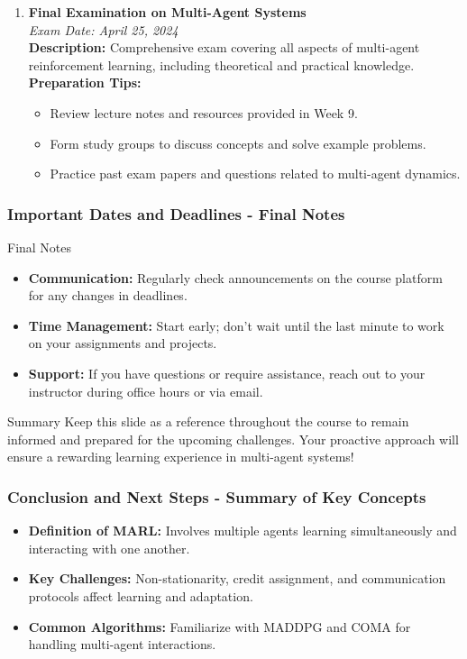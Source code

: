 \documentclass[aspectratio=169]{beamer}
\begin{document}
\begin{frame}[fragile]
\begin{enumerate}
        \item \textbf{Final Examination on Multi-Agent Systems}\\
        \textit{Exam Date: April 25, 2024}\\
        \textbf{Description:} Comprehensive exam covering all aspects of multi-agent reinforcement learning, including theoretical and practical knowledge.\\
        \textbf{Preparation Tips:}
        \begin{itemize}
            \item Review lecture notes and resources provided in Week 9.
            \item Form study groups to discuss concepts and solve example problems.
            \item Practice past exam papers and questions related to multi-agent dynamics.
        \end{itemize}
    \end{enumerate}
\end{frame}

\begin{frame}[fragile]
    \frametitle{Important Dates and Deadlines - Final Notes}
    \begin{block}{Final Notes}
        \begin{itemize}
            \item \textbf{Communication:} Regularly check announcements on the course platform for any changes in deadlines.
            \item \textbf{Time Management:} Start early; don’t wait until the last minute to work on your assignments and projects.
            \item \textbf{Support:} If you have questions or require assistance, reach out to your instructor during office hours or via email.
        \end{itemize}
    \end{block}
    
    \begin{block}{Summary}
        Keep this slide as a reference throughout the course to remain informed and prepared for the upcoming challenges. Your proactive approach will ensure a rewarding learning experience in multi-agent systems!
    \end{block}
\end{frame}

\begin{frame}[fragile]
    \frametitle{Conclusion and Next Steps - Summary of Key Concepts}
    \begin{itemize}
        \item \textbf{Definition of MARL:} Involves multiple agents learning simultaneously and interacting with one another.
        \item \textbf{Key Challenges:} Non-stationarity, credit assignment, and communication protocols affect learning and adaptation.
        \item \textbf{Common Algorithms:} Familiarize with MADDPG and COMA for handling multi-agent interactions.
    \end{itemize}
\end{frame}
\end{document}
